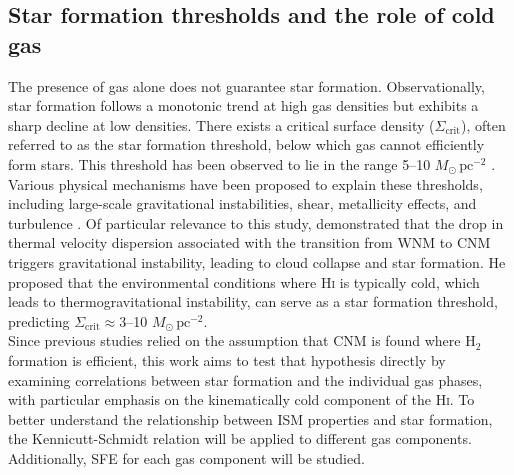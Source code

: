 \subsection{Star formation thresholds and the role of cold gas}

The presence of gas alone does not guarantee star formation. Observationally, star formation follows a monotonic trend at high gas densities but exhibits a sharp decline at low densities. There exists a critical surface density ($\Sigma_{\mathrm{crit}}$), often referred to as the star formation threshold, below which gas cannot efficiently form stars. This threshold has been observed to lie in the range 5--10 $M_\odot\,\mathrm{pc}^{-2}$ \citep{Kennicutt1998, Martin2001}.\\\indent
Various physical mechanisms have been proposed to explain these thresholds, including large-scale gravitational instabilities, shear, metallicity effects, and turbulence \citep{Leroy2008, Sternberg2014, Federrath2015}. Of particular relevance to this study, \citet{Schaye2004} demonstrated that the drop in thermal velocity dispersion associated with the transition from WNM to CNM triggers gravitational instability, leading to cloud collapse and star formation. He proposed that the environmental conditions where \textrm{H\textsc{i}} is typically cold, which leads to thermogravitational instability, can serve as a star formation threshold, predicting $\Sigma_{\mathrm{crit}} \approx 3$--10 $M_\odot\,\mathrm{pc}^{-2}$.\\[2em]  \indent
Since previous studies relied on the assumption that CNM is found where H$_2$ formation is efficient, this work aims to test that hypothesis directly by examining correlations between star formation and the individual gas phases, with particular emphasis on the kinematically cold component of the \textrm{H\textsc{i}}. To better understand the relationship between ISM properties and star formation, the Kennicutt-Schmidt relation will be applied to different gas components. Additionally, SFE for each gas component will be studied.

